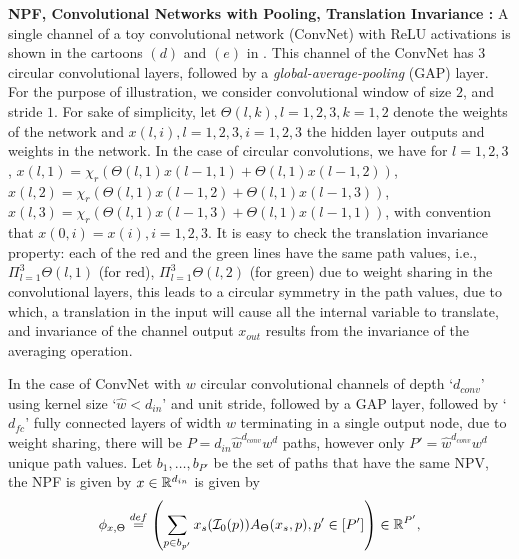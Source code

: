 \textbf{NPF, Convolutional Networks with Pooling, Translation Invariance :} A single channel of a toy convolutional network (ConvNet) with ReLU activations is shown in the cartoons $(d)$ and $(e)$ in . This channel of the ConvNet has $3$ circular convolutional layers, followed by a \emph{global-average-pooling} (GAP) layer. For the purpose of illustration, we consider convolutional window of size $2$, and stride $1$. For sake of simplicity, let  $\Theta(l,k),l=1,2,3,k=1,2$ denote the weights of the network and $x(l,i),l=1,2,3,i=1,2,3$ the hidden layer outputs and weights in the network. In the case of circular convolutions, we have for $l=1,2,3$,  $x(l,1)=\chi_r\left(\Theta(l,1)x(l-1,1)+\Theta(l,1)x(l-1,2) \right)$, $x(l,2)=\chi_r\left(\Theta(l,1)x(l-1,2)+\Theta(l,1)x(l-1,3) \right)$, $x(l,3)=\chi_r\left(\Theta(l,1)x(l-1,3)+\Theta(l,1)x(l-1,1) \right)$, with convention that $x(0,i)=x(i),i=1,2,3$. It is easy to check the translation invariance property: each of the red and the green lines have the same path values, i.e., $\Pi_{l=1}^3\Theta(l,1)$ (for red), $\Pi_{l=1}^3\Theta(l,2)$ (for green) due to weight sharing in the convolutional layers, this leads to a circular symmetry in the path values, due to which, a translation in the input will cause all the internal variable to translate, and invariance of the channel output $x_{out}$ results from the invariance of the averaging operation. 

In the case of ConvNet with $w$ circular convolutional channels of depth `$d_{conv}$' using kernel size `$\hat{w}<d_{in}$' and unit stride, followed by a GAP layer, followed by `$d_{fc}$' fully connected layers of width $w$ terminating in a single output node, due to weight sharing, there will be $P=d_{in}\hat{w}^{d_{conv}}w^d$ paths, however only $P'=\hat{w}^{d_{conv}}w^d$ unique path values. Let $b_{1},\ldots,b_{P'}$ be the set of paths that have the same NPV, the NPF is given by 
$x\in\mathbb{R}^{d_{in}}$ is given by 
\begin{align}\label{eq:npfconvdef}
\phi_{x,\Theta}\stackrel{def}=\left(\sum_{p\in b_{p'}}x_s(\mathcal{I}_0(p))A_{\Theta}(x_s,p) , p'\in[P']\right)\in\mathbb{R}^{P'},
\end{align}




